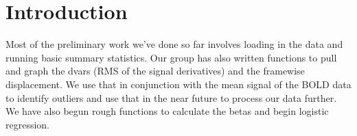 \section{Introduction}
Most of the preliminary work we've done so far involves loading in the data and running basic summary statistics. Our group has also written functions to pull and graph the dvars (RMS of the signal derivatives) and the framewise displacement. We use that in conjunction with the mean signal of the BOLD data to identify outliers and use that in the near future to process our data further. We have also begun rough functions to calculate the betas and begin logistic regression. 
